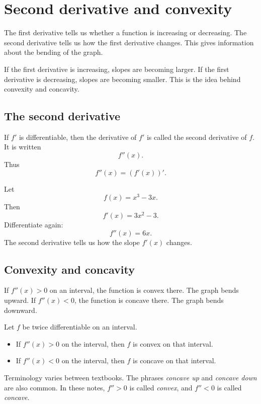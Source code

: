\section{Second derivative and convexity}

The first derivative tells us whether a function is increasing or decreasing. The second derivative tells us how the first derivative changes. This gives information about the bending of the graph.

If the first derivative is increasing, slopes are becoming larger. If the first derivative is decreasing, slopes are becoming smaller. This is the idea behind convexity and concavity.

\subsection*{The second derivative}

If \(f'\) is differentiable, then the derivative of \(f'\) is called the second derivative of \(f\). It is written
\[
f''(x).
\]
Thus
\[
f''(x)=(f'(x))'.
\]

\begin{examplebox}
Let
\[
f(x)=x^3-3x.
\]
Then
\[
f'(x)=3x^2-3.
\]
Differentiate again:
\[
f''(x)=6x.
\]
The second derivative tells us how the slope \(f'(x)\) changes.
\end{examplebox}

\subsection*{Convexity and concavity}

If \(f''(x)>0\) on an interval, the function is convex there. The graph bends upward. If \(f''(x)<0\), the function is concave there. The graph bends downward.

\begin{theorembox}
Let \(f\) be twice differentiable on an interval.
\begin{itemize}
\item If \(f''(x)>0\) on the interval, then \(f\) is convex on that interval.
\item If \(f''(x)<0\) on the interval, then \(f\) is concave on that interval.
\end{itemize}
\end{theorembox}

\begin{remarkbox}
Terminology varies between textbooks. The phrases \emph{concave up} and \emph{concave down} are also common. In these notes, \(f''>0\) is called \emph{convex}, and \(f''<0\) is called \emph{concave}.
\end{remarkbox}

